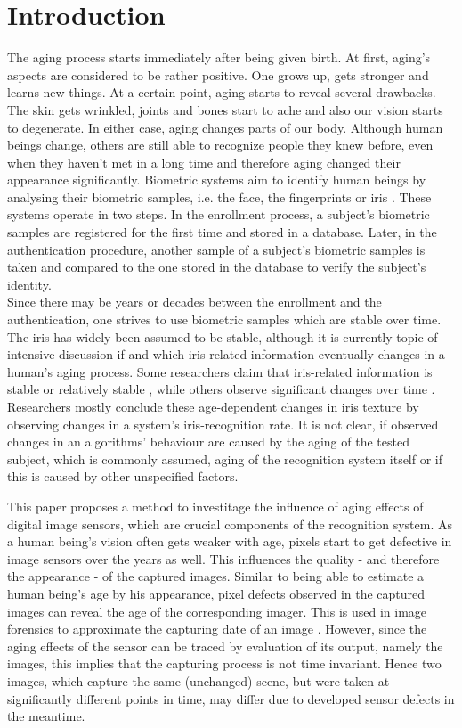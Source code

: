 \documentclass[10pt,twocolumn,letterpaper]{article}
\begin{document}
\section{Introduction}
The aging process starts immediately after being given birth. At first, aging's aspects are considered to be rather positive. One grows up, gets stronger and learns new things. At a certain point, aging starts to reveal several drawbacks. The skin gets wrinkled, joints and bones start to ache and also our vision starts to degenerate. In either case, aging changes parts of our body. Although human beings change, others are still able to recognize people they knew before, even when they haven't met in a long time and therefore aging changed their appearance significantly.
Biometric systems aim to identify human beings by analysing their biometric samples, i.e. the face, the fingerprints or iris \cite{rathgeb}. These systems operate in two steps. In the enrollment process, a subject's biometric samples are registered for the first time and stored in a database. Later, in the authentication procedure, another sample of a subject's biometric samples is taken and compared to the one stored in the database to verify the subject's identity. \\
Since there may be years or decades between the enrollment and the authentication, one strives to use biometric samples which are stable over time. The iris has widely been assumed to be stable, although it is currently topic of intensive discussion if and which iris-related information eventually changes in a human's aging process. Some researchers claim that iris-related information is stable or relatively stable \cite{daugmanPatent, daugmanNoChange, grotherStability, monroDCTIris}, while others observe significant changes over time \cite{rankinChange, rankinChangeResponse, fenkerIrisAging, czajkaTemplateAging, fairhurstNonstability}. Researchers mostly conclude these age-dependent changes in iris texture by observing changes in a system's iris-recognition rate. It is not clear, if observed changes in an algorithms' behaviour are caused by the aging of the tested subject, which is commonly assumed, aging of the recognition system itself or if this is caused by other unspecified factors.

This paper proposes a method to investitage the influence of aging effects of digital image sensors, which are crucial components of the recognition system. As a human being's vision often gets weaker with age, pixels start to get defective in image sensors over the years as well. This influences the quality - and therefore the appearance - of the captured images. Similar to being able to estimate a human being's age by his appearance, pixel defects observed in the captured images can reveal the age of the corresponding imager. This is used in image forensics to approximate the capturing date of an image \cite{fridrich}. However, since the aging effects of the sensor can be traced by evaluation of its output, namely the images, this implies that the capturing process is not time invariant. Hence two images, which capture the same (unchanged) scene, but were taken at significantly different points in time, may differ due to developed sensor defects in the meantime.
\end{document}
